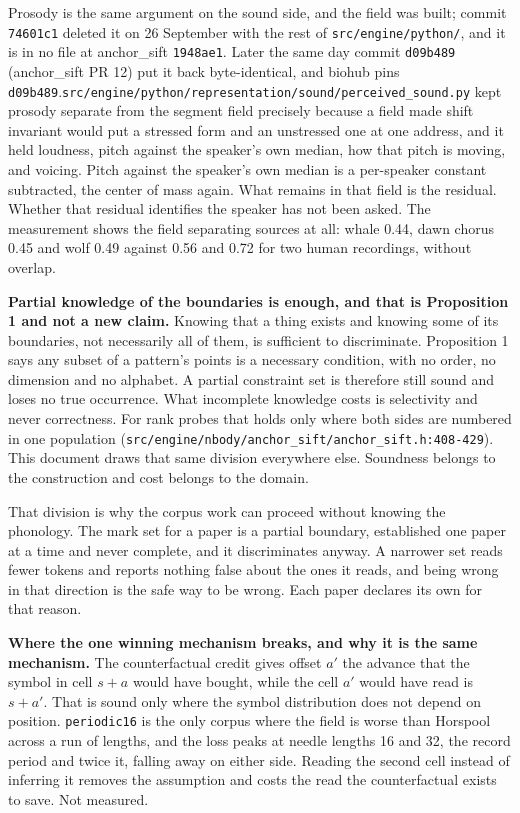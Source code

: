 Prosody is the same argument on the sound side, and the field was built; commit \texttt{74601c1} deleted it on 26 September with the rest of \texttt{src/\allowbreak{}engine/\allowbreak{}python/}, and it is in no file at anchor\_sift \texttt{1948ae1}. Later the same day commit \texttt{d09b489} (anchor\_sift PR 12) put it back byte-identical, and biohub pins \texttt{d09b489}.\texttt{src/\allowbreak{}engine/\allowbreak{}python/\allowbreak{}representation/\allowbreak{}sound/\allowbreak{}perceived\_\allowbreak{}sound.\allowbreak{}py} kept prosody separate from the segment field precisely because a field made shift invariant would put a stressed form and an unstressed one at one address, and it held loudness, pitch against the speaker's own median, how that pitch is moving, and voicing. Pitch against the speaker's own median is a per-speaker constant subtracted, the center of mass again. What remains in that field is the residual. Whether that residual identifies the speaker has not been asked. The measurement shows the field separating sources at all: whale 0.44, dawn chorus 0.45 and wolf 0.49 against 0.56 and 0.72 for two human recordings, without overlap.

\textbf{Partial knowledge of the boundaries is enough, and that is Proposition 1 and not a new claim.} Knowing that a thing exists and knowing some of its boundaries, not necessarily all of them, is sufficient to discriminate. Proposition 1 says any subset of a pattern's points is a necessary condition, with no order, no dimension and no alphabet. A partial constraint set is therefore still sound and loses no true occurrence. What incomplete knowledge costs is selectivity and never correctness. For rank probes that holds only where both sides are numbered in one population (\texttt{src/\allowbreak{}engine/\allowbreak{}nbody/\allowbreak{}anchor\_sift/\allowbreak{}anchor\_sift.h:408-429}). This document draws that same division everywhere else. Soundness belongs to the construction and cost belongs to the domain.

That division is why the corpus work can proceed without knowing the phonology. The mark set for a paper is a partial boundary, established one paper at a time and never complete, and it discriminates anyway. A narrower set reads fewer tokens and reports nothing false about the ones it reads, and being wrong in that direction is the safe way to be wrong. Each paper declares its own for that reason.

\textbf{Where the one winning mechanism breaks, and why it is the same mechanism.} The counterfactual credit gives offset \(a'\) the advance that the symbol in cell \(s+a\) would have bought, while the cell \(a'\) would have read is \(s+a'\). That is sound only where the symbol distribution does not depend on position. \texttt{periodic16} is the only corpus where the field is worse than Horspool across a run of lengths, and the loss peaks at needle lengths 16 and 32, the record period and twice it, falling away on either side. Reading the second cell instead of inferring it removes the assumption and costs the read the counterfactual exists to save. Not measured.

